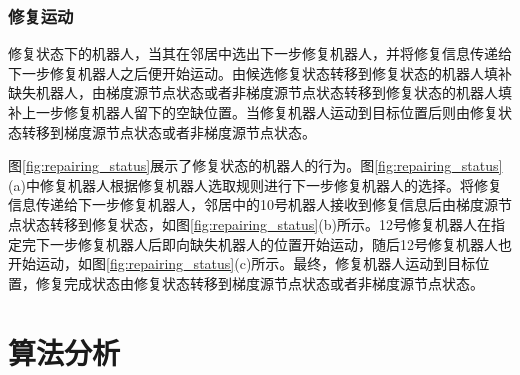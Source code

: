 \subsubsection{修复运动}
修复状态下的机器人，当其在邻居中选出下一步修复机器人，并将修复信息传递给下一步修复机器人之后便开始运动。由候选修复状态转移到修复状态的机器人填补缺失机器人，由梯度源节点状态或者非梯度源节点状态转移到修复状态的机器人填补上一步修复机器人留下的空缺位置。当修复机器人运动到目标位置后则由修复状态转移到梯度源节点状态或者非梯度源节点状态。

图\ref{fig:repairing_status}展示了修复状态的机器人的行为。图\ref{fig:repairing_status}(a)中修复机器人根据修复机器人选取规则进行下一步修复机器人的选择。将修复信息传递给下一步修复机器人，邻居中的10号机器人接收到修复信息后由梯度源节点状态转移到修复状态，如图\ref{fig:repairing_status}(b)所示。12号修复机器人在指定完下一步修复机器人后即向缺失机器人的位置开始运动，随后12号修复机器人也开始运动，如图\ref{fig:repairing_status}(c)所示。最终，修复机器人运动到目标位置，修复完成状态由修复状态转移到梯度源节点状态或者非梯度源节点状态。

\begin{figure*}[!htbp]
	\centering
		
\end{figure*}

\section{算法分析}


